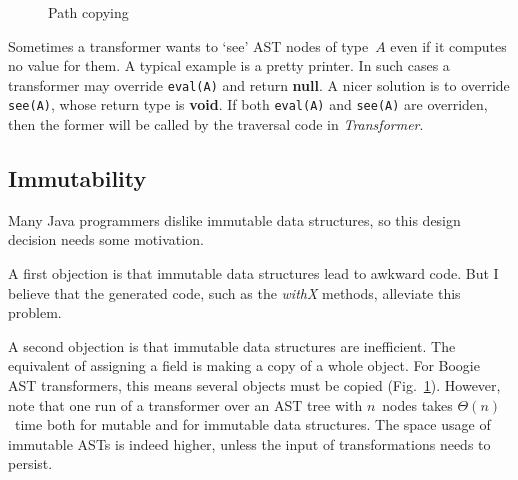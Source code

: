 \documentclass{llncs}
\newcommand{\jmlCode}{\lstinline[style=jml,basicstyle=\normalsize]}
\begin{document}
\begin{figure}\centering %
\caption{Path copying}\label{fig:path-copying}
\end{figure} %

Sometimes a transformer wants to `see' AST nodes of type~$A$
even if it computes no value for them. A typical example is
a pretty printer. In such cases a transformer may override
\jmlCode|eval(A)| and return \textbf{null}. A nicer solution is
to override \jmlCode|see(A)|, whose return type is \textbf{void}.
If both \jmlCode|eval(A)| and \jmlCode|see(A)| are overriden,
then the former will be called by the traversal code in
\textit{Transformer}.

\subsection{Immutability} %
\label{sec:immutability}

Many Java programmers dislike immutable data structures, so this design
decision needs some motivation.

A first objection is that immutable data structures lead to awkward code.
But I believe that the generated code, such as the \textit{withX} methods,
alleviate this problem.

A second objection is that immutable data structures are inefficient. The
equivalent of assigning a field is making a copy of a whole object. For
Boogie AST transformers, this means several objects must be copied
(Fig.~\ref{fig:path-copying}). However, note that one run of a transformer
over an AST tree with $n$~nodes takes $\Theta(n)$~time both for mutable and
for immutable data structures. The space usage of immutable ASTs is indeed
higher, unless the input of transformations needs to persist.
\end{document}
